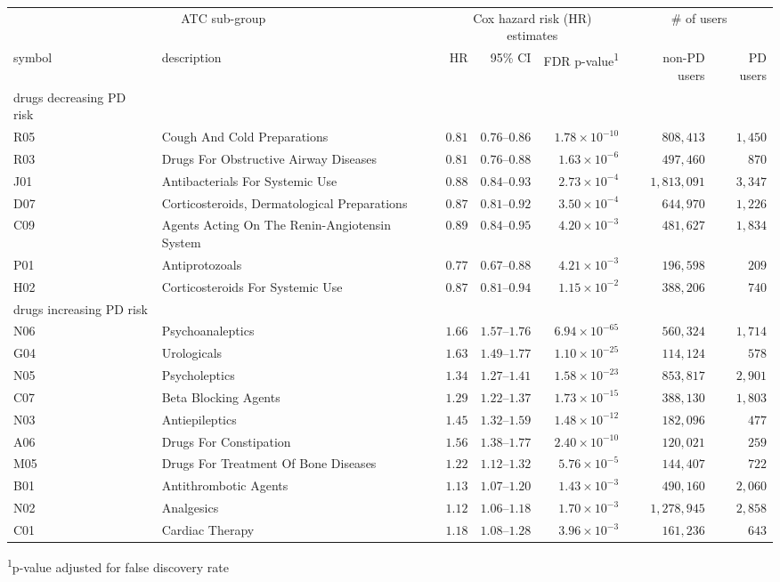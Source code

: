 \captionsetup[table]{labelformat=empty,skip=1pt}
\begin{longtable}{llrrrrr}
\toprule
\multicolumn{2}{c}{ATC sub-group} & \multicolumn{3}{c}{Cox hazard risk (HR) estimates} & \multicolumn{2}{c}{\# of users} \\ 
 \cmidrule(lr){1-2} \cmidrule(lr){3-5} \cmidrule(lr){6-7}
symbol & description & HR & 95\% CI & FDR p-value\textsuperscript{1} & non-PD users & PD users \\ 
\midrule
\multicolumn{1}{l}{drugs decreasing PD risk} \\ 
\midrule
R05 & Cough And Cold Preparations & $0.81$ & $0.76$–$0.86$ & $1.78 \times 10^{-10}$ & $808,413$ & $1,450$ \\ 
R03 & Drugs For Obstructive Airway Diseases & $0.81$ & $0.76$–$0.88$ & $1.63 \times 10^{-6}$ & $497,460$ & $870$ \\ 
J01 & Antibacterials For Systemic Use & $0.88$ & $0.84$–$0.93$ & $2.73 \times 10^{-4}$ & $1,813,091$ & $3,347$ \\ 
D07 & Corticosteroids, Dermatological Preparations & $0.87$ & $0.81$–$0.92$ & $3.50 \times 10^{-4}$ & $644,970$ & $1,226$ \\ 
C09 & Agents Acting On The Renin-Angiotensin System & $0.89$ & $0.84$–$0.95$ & $4.20 \times 10^{-3}$ & $481,627$ & $1,834$ \\ 
P01 & Antiprotozoals & $0.77$ & $0.67$–$0.88$ & $4.21 \times 10^{-3}$ & $196,598$ & $209$ \\ 
H02 & Corticosteroids For Systemic Use & $0.87$ & $0.81$–$0.94$ & $1.15 \times 10^{-2}$ & $388,206$ & $740$ \\ 
\midrule
\multicolumn{1}{l}{drugs increasing PD risk} \\ 
\midrule
N06 & Psychoanaleptics & $1.66$ & $1.57$–$1.76$ & $6.94 \times 10^{-65}$ & $560,324$ & $1,714$ \\ 
G04 & Urologicals & $1.63$ & $1.49$–$1.77$ & $1.10 \times 10^{-25}$ & $114,124$ & $578$ \\ 
N05 & Psycholeptics & $1.34$ & $1.27$–$1.41$ & $1.58 \times 10^{-23}$ & $853,817$ & $2,901$ \\ 
C07 & Beta Blocking Agents & $1.29$ & $1.22$–$1.37$ & $1.73 \times 10^{-15}$ & $388,130$ & $1,803$ \\ 
N03 & Antiepileptics & $1.45$ & $1.32$–$1.59$ & $1.48 \times 10^{-12}$ & $182,096$ & $477$ \\ 
A06 & Drugs For Constipation & $1.56$ & $1.38$–$1.77$ & $2.40 \times 10^{-10}$ & $120,021$ & $259$ \\ 
M05 & Drugs For Treatment Of Bone Diseases & $1.22$ & $1.12$–$1.32$ & $5.76 \times 10^{-5}$ & $144,407$ & $722$ \\ 
B01 & Antithrombotic Agents & $1.13$ & $1.07$–$1.20$ & $1.43 \times 10^{-3}$ & $490,160$ & $2,060$ \\ 
N02 & Analgesics & $1.12$ & $1.06$–$1.18$ & $1.70 \times 10^{-3}$ & $1,278,945$ & $2,858$ \\ 
C01 & Cardiac Therapy & $1.18$ & $1.08$–$1.28$ & $3.96 \times 10^{-3}$ & $161,236$ & $643$ \\ 
 \bottomrule
\end{longtable}
\vspace{-5mm}
\begin{minipage}{\linewidth}
\textsuperscript{1}p-value adjusted for false discovery rate \\ 
\end{minipage}

